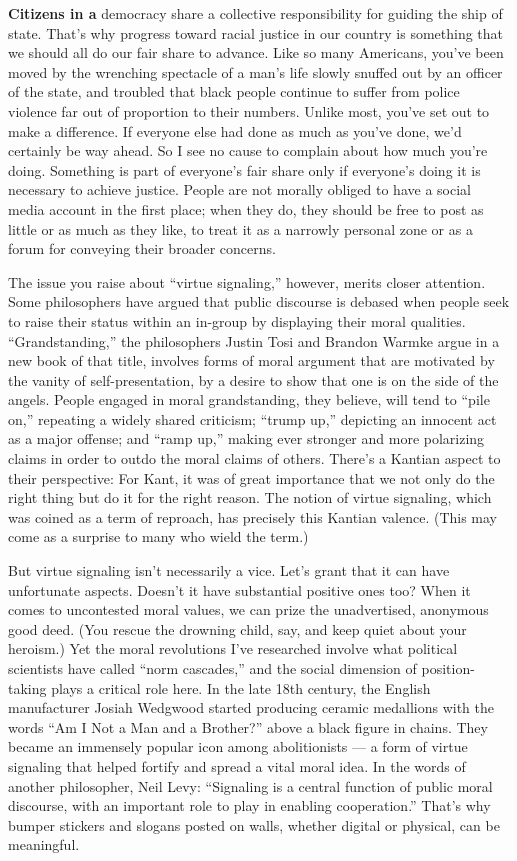 \textbf{Citizens in a} democracy share a collective responsibility for
guiding the ship of state. That's why progress toward racial justice in
our country is something that we should all do our fair share to
advance. Like so many Americans, you've been moved by the wrenching
spectacle of a man's life slowly snuffed out by an officer of the state,
and troubled that black people continue to suffer from police violence
far out of proportion to their numbers. Unlike most, you've set out to
make a difference. If everyone else had done as much as you've done,
we'd certainly be way ahead. So I see no cause to complain about how
much you're doing. Something is part of everyone's fair share only if
everyone's doing it is necessary to achieve justice. People are not
morally obliged to have a social media account in the first place; when
they do, they should be free to post as little or as much as they like,
to treat it as a narrowly personal zone or as a forum for conveying
their broader concerns.

The issue you raise about ``virtue signaling,'' however, merits closer
attention. Some philosophers have argued that public discourse is
debased when people seek to raise their status within an in-group by
displaying their moral qualities. ``Grandstanding,'' the philosophers
Justin Tosi and Brandon Warmke argue in a new book of that title,
involves forms of moral argument that are motivated by the vanity of
self-presentation, by a desire to show that one is on the side of the
angels. People engaged in moral grandstanding, they believe, will tend
to ``pile on,'' repeating a widely shared criticism; ``trump up,''
depicting an innocent act as a major offense; and ``ramp up,'' making
ever stronger and more polarizing claims in order to outdo the moral
claims of others. There's a Kantian aspect to their perspective: For
Kant, it was of great importance that we not only do the right thing but
do it for the right reason. The notion of virtue signaling, which was
coined as a term of reproach, has precisely this Kantian valence. (This
may come as a surprise to many who wield the term.)

But virtue signaling isn't necessarily a vice. Let's grant that it can
have unfortunate aspects. Doesn't it have substantial positive ones too?
When it comes to uncontested moral values, we can prize the
unadvertised, anonymous good deed. (You rescue the drowning child, say,
and keep quiet about your heroism.) Yet the moral revolutions I've
researched involve what political scientists have called ``norm
cascades,'' and the social dimension of position-taking plays a critical
role here. In the late 18th century, the English manufacturer Josiah
Wedgwood started producing ceramic medallions with the words ``Am I Not
a Man and a Brother?'' above a black figure in chains. They became an
immensely popular icon among abolitionists --- a form of virtue
signaling that helped fortify and spread a vital moral idea. In the
words of another philosopher, Neil Levy: ``Signaling is a central
function of public moral discourse, with an important role to play in
enabling cooperation.'' That's why bumper stickers and slogans posted on
walls, whether digital or physical, can be meaningful.

